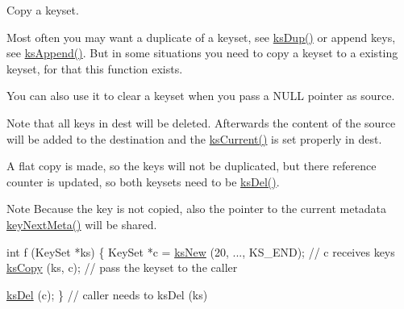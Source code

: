 Copy a keyset. 

Most often you may want a duplicate of a keyset, see \hyperlink{group__keyset_gac59e4b328245463f1451f68d5106151c}{ks\-Dup()} or append keys, see \hyperlink{group__keyset_ga21eb9c3a14a604ee3a8bdc779232e7b7}{ks\-Append()}. But in some situations you need to copy a keyset to a existing keyset, for that this function exists.

You can also use it to clear a keyset when you pass a N\-U\-L\-L pointer as {\ttfamily source}.

Note that all keys in {\ttfamily dest} will be deleted. Afterwards the content of the source will be added to the destination and the \hyperlink{group__keyset_ga4287b9416912c5f2ab9c195cb74fb094}{ks\-Current()} is set properly in {\ttfamily dest}.

A flat copy is made, so the keys will not be duplicated, but there reference counter is updated, so both keysets need to be \hyperlink{group__keyset_ga27e5c16473b02a422238c8d970db7ac8}{ks\-Del()}.

\begin{DoxyNote}{Note}
Because the key is not copied, also the pointer to the current metadata \hyperlink{group__keymeta_ga4c88342f580a4291455a801af71ce048}{key\-Next\-Meta()} will be shared. 
\end{DoxyNote}



\begin{DoxyCode}
\textcolor{keywordtype}{int} f (KeySet *ks)
\{
        KeySet *c = \hyperlink{group__keyset_ga671e1aaee3ae9dc13b4834a4ddbd2c3c}{ksNew} (20, ..., KS\_END);
        \textcolor{comment}{// c receives keys}
        \hyperlink{group__keyset_gaba1f1dbea191f4d7e7eb3e4296ae7d5e}{ksCopy} (ks, c); \textcolor{comment}{// pass the keyset to the caller}

        \hyperlink{group__keyset_ga27e5c16473b02a422238c8d970db7ac8}{ksDel} (c);
\}       \textcolor{comment}{// caller needs to ksDel (ks)}
\end{DoxyCode}



